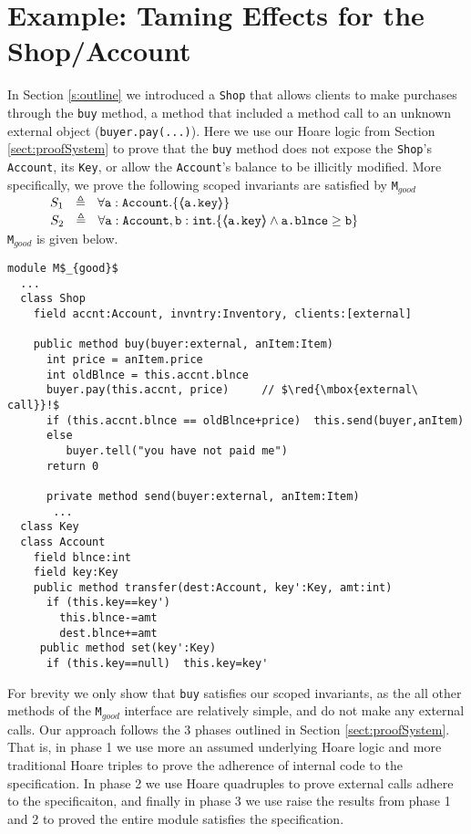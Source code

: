 \section{Example: Taming Effects for the Shop/Account}
In Section \ref{s:outline} we introduced a \verb|Shop| that allows clients to make purchases through the
\verb|buy| method, a method that included a method call to an unknown external object (\verb|buyer.pay(...)|).
Here we use our Hoare logic from Section \ref{sect:proofSystem} to prove that the \verb|buy| method
does not expose the \verb|Shop|'s  \verb|Account|, its \verb|Key|, or allow the \verb|Account|'s balance to be illicitly modified. 
More specifically, we prove the following scoped invariants are satisfied by \verb|M|$_{good}$\\
$\strut  \SPSP  S_1\ \  \triangleq \ \ \TwoStatesN  {\prg{a}:\prg{Account}}  {\inside{\prg{a.key}}} $ 
 \\
$\strut  \SPSP  S_2\ \  \triangleq \ \ \TwoStatesN{ \prg{a}:\prg{Account},\prg{b}:\prg{int} } {\inside{\prg{a.key}} \wedge \prg{a.\balance} \geq \prg{b} } $\\
\verb|M|$_{good}$ is given below.
\begin{lstlisting}[mathescape=true, language=Chainmail, frame=lines]
module M$_{good}$
  ...   
  class Shop
    field accnt:Account, invntry:Inventory, clients:[external]    
  
    public method buy(buyer:external, anItem:Item)
      int price = anItem.price
      int oldBlnce = this.accnt.blnce
      buyer.pay(this.accnt, price)     // $\red{\mbox{external\ call}}!$
      if (this.accnt.blnce == oldBlnce+price)  this.send(buyer,anItem)
      else
         buyer.tell("you have not paid me") 
      return 0
     
      private method send(buyer:external, anItem:Item)  
       ... 
  class Key
  class Account
    field blnce:int 
    field key:Key
    public method transfer(dest:Account, key':Key, amt:int)
      if (this.key==key')
        this.blnce-=amt
        dest.blnce+=amt
     public method set(key':Key)
      if (this.key==null)  this.key=key'
\end{lstlisting}

For brevity we only show that \verb|buy| satisfies our scoped invariants, as the all other methods of 
the \verb|M|$_{good}$ interface are relatively simple, and do not make any external calls. 
Our approach follows the 3 phases outlined in Section \ref{sect:proofSystem}. That is, in
phase 1 we use more an assumed underlying Hoare logic and more traditional Hoare triples to prove the adherence of internal code to
the specification. In phase 2 we use Hoare quadruples to prove external calls adhere
to the specificaiton, and finally in phase 3 we use raise the results from phase 1 and 2 to proved
the entire module satisfies the specification.

